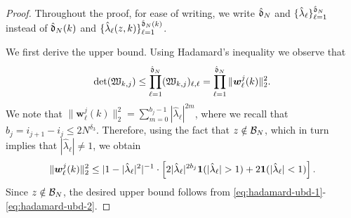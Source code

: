 \documentclass{amsart}
\numberwithin{equation}{section}
\def\corAB{}
\begin{document}
\begin{proof}
Throughout the proof, for ease of writing, we write $\hat{\mathfrak{d}}_N$ and $\{\hat{\lambda}_\ell\}_{\ell=1}^{\hat{\mathfrak{d}}_N}$ instead of $\hat{\mathfrak{d}}_N(k)$ and $\{\hat{\lambda}_\ell(z,k)\}_{\ell=1}^{\hat{\mathfrak{d}}_N(k)}$.

We first derive the upper bound. Using Hadamard's inequality we observe that
 \begin{equation}\label{eq:hadamard-ubd-1}
 \det(\mathfrak{W}_{k,j}) \le \prod_{\ell=1}^{\corAB{\hat\gd_N}}(\mathfrak{W}_{k,j})_{\ell,\ell} = \prod_{\ell=1}^{\corAB{\hat\gd_N}} \|{\bm w}_\ell^j(k)\|_2^2.
 \end{equation}
  We note that $\|{\bm w}_{\ell}^j(k)\|_2^2= \sum_{m=0}^{b_j-1} |\hat{\lambda}_\ell|^{2m}$, where we recall that $b_j = i_{j+1}-i_j \le 2 N^{\delta_3}$. Therefore, using the fact that $z \notin \mathcal{B}_N$, which in turn implies that $|\hat{\lambda}_\ell| \ne 1$, we obtain
 \begin{equation}\label{eq:hadamard-ubd-2}
 \|{\bm w}_{\ell}^j(k)\|_2^2 \le  |1-|\hat{\lambda}_\ell|^2|^{-1} \cdot \left[ 2 |\hat{\lambda}_\ell|^{2b_j} {\bf 1}(|\hat{\lambda}_\ell| > 1) + 2 {\bf 1}(|\hat{\lambda}_\ell| < 1)\right].
 \end{equation}
 Since $z \notin \mathcal{B}_N$, the desired upper bound follows from \eqref{eq:hadamard-ubd-1}-\eqref{eq:hadamard-ubd-2}.



\end{proof}
\end{document}
